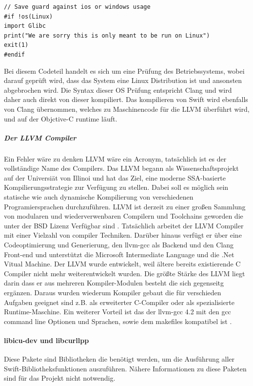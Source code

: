 \lstset{caption=OS Prüfung, basicstyle=\small\ttfamily, label=lst:osprüfung, language=C}
\begin{lstlisting}
// Save guard against ios or windows usage
#if !os(Linux)
import Glibc
print("We are sorry this is only meant to be run on Linux")
exit(1)
#endif
\end{lstlisting}

Bei diesem Codeteil handelt es sich um eine Prüfung des Betriebssystems, wobei darauf geprüft wird, dass das System eine Linux Distribution ist und ansonsten abgebrochen wird. Die Syntax dieser OS Prüfung entspricht Clang und wird daher auch direkt von dieser kompiliert. Das kompilieren von Swift wird ebenfalls von Clang übernommen, welches zu Maschinencode für die LLVM überführt wird, und auf der Objctive-C runtime läuft.

\subparagraph{Der LLVM Compiler}
Ein Fehler wäre zu denken LLVM wäre ein Acronym, tatsächlich ist es der vollständige Name des Compilers. Das LLVM begann als Wissenschaftsprojekt auf der Universiät von Illinoi und hat das Ziel, eine moderne SSA-basierte Kompilierungsstrategie zur Verfügung zu stellen. Dabei soll es möglich sein statische wie auch dynamische Kompilierung von verschiedenen Programiersprachen durchzuführen. LLVM ist derzeit zu einer großen Sammlung von modularen und wiederverwenbaren Compilern und Toolchains geworden die unter der BSD Lizenz Verfügbar sind \parencite{llvm}. Tatsächlich arbeitet der LLVM Compiler mit einer Vielzahl von compiler Techniken. Darüber hinaus verfügt er über eine Codeoptimierung und Generierung, den llvm-gcc als Backend und den Clang Front-end und unterstützt die Microsoft Intermediate Language und die .Net Vitual Machine. Der LLVM wurde entwickelt, weil ältere bereits existierende C Compiler nicht mehr weiterentwickelt wurden. Die größte Stärke des LLVM liegt darin dass er aus mehreren Kompiler-Modulen besteht die sich gegenseitg ergänzen. Daraus wurden wiederum Kompiler gebaut die für verschieden Aufgaben geeignet sind z.B. als erweiterter C-Compiler oder als spezialisierte Runtime-Maschine. Ein weiterer Vorteil ist das der llvm-gcc 4.2 mit den gcc command line Optionen und Sprachen, sowie dem makefiles kompatibel ist \parencite{llvmpulbic}.

\paragraph{libicu-dev und libcurllpp}
Diese Pakete sind Bibliotheken die benötigt werden, um die Ausführung aller Swift-Bibliotheksfunktionen auszuführen. Nähere Informationen zu diese Paketen sind für das Projekt nicht notwendig.

